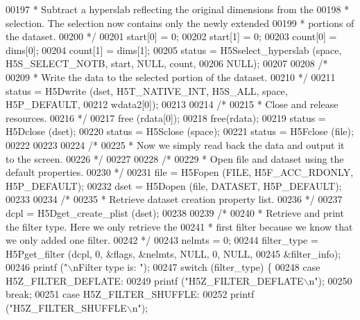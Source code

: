 \begin{DoxyCode}
{00197 \textcolor{comment}{     * Subtract a hyperslab reflecting the original dimensions from the}
00198 \textcolor{comment}{     * selection.  The selection now contains only the newly extended}
00199 \textcolor{comment}{     * portions of the dataset.}
00200 \textcolor{comment}{     */}
00201     start[0] = 0;
00202     start[1] = 0;
00203     count[0] = dims[0];
00204     count[1] = dims[1];
00205     status = H5Sselect\_hyperslab (space, H5S\_SELECT\_NOTB, start, NULL, count,
00206                 NULL);
00207 
00208     \textcolor{comment}{/*}
00209 \textcolor{comment}{     * Write the data to the selected portion of the dataset.}
00210 \textcolor{comment}{     */}
00211     status = H5Dwrite (dset, H5T\_NATIVE\_INT, H5S\_ALL, space, H5P\_DEFAULT,
00212                 wdata2[0]);
00213 
00214     \textcolor{comment}{/*}
00215 \textcolor{comment}{     * Close and release resources.}
00216 \textcolor{comment}{     */}
00217     free (rdata[0]);
00218     free(rdata);
00219     status = H5Dclose (dset);
00220     status = H5Sclose (space);
00221     status = H5Fclose (file);
00222 
00223 
00224     \textcolor{comment}{/*}
00225 \textcolor{comment}{     * Now we simply read back the data and output it to the screen.}
00226 \textcolor{comment}{     */}
00227 
00228     \textcolor{comment}{/*}
00229 \textcolor{comment}{     * Open file and dataset using the default properties.}
00230 \textcolor{comment}{     */}
00231     file = H5Fopen (FILE, H5F\_ACC\_RDONLY, H5P\_DEFAULT);
00232     dset = H5Dopen (file, DATASET, H5P\_DEFAULT);
00233 
00234     \textcolor{comment}{/*}
00235 \textcolor{comment}{     * Retrieve dataset creation property list.}
00236 \textcolor{comment}{     */}
00237     dcpl = H5Dget\_create\_plist (dset);
00238 
00239     \textcolor{comment}{/*}
00240 \textcolor{comment}{     * Retrieve and print the filter type.  Here we only retrieve the}
00241 \textcolor{comment}{     * first filter because we know that we only added one filter.}
00242 \textcolor{comment}{     */}
00243     nelmts = 0;
00244     filter\_type = H5Pget\_filter (dcpl, 0, &flags, &nelmts, NULL, 0, NULL,
00245                 &filter\_info);
00246     printf (\textcolor{stringliteral}{"\(\backslash\)nFilter type is: "});
00247     \textcolor{keywordflow}{switch} (filter\_type) \{
00248         \textcolor{keywordflow}{case} H5Z\_FILTER\_DEFLATE:
00249             printf (\textcolor{stringliteral}{"H5Z\_FILTER\_DEFLATE\(\backslash\)n"});
00250             \textcolor{keywordflow}{break};
00251         \textcolor{keywordflow}{case} H5Z\_FILTER\_SHUFFLE:
00252             printf (\textcolor{stringliteral}{"H5Z\_FILTER\_SHUFFLE\(\backslash\)n"});
}
\end{DoxyCode}

